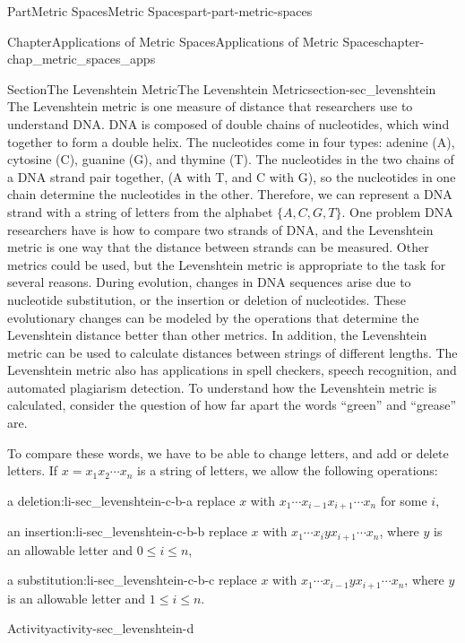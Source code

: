 \documentclass[oneside,10pt,]{book}
\numberwithin{equation}{chapter}
\begin{document}
\begin{partptx}{Part}{Metric Spaces}{}{Metric Spaces}{}{}{part-part-metric-spaces}
\begin{chapterptx}{Chapter}{Applications of Metric Spaces}{}{Applications of Metric Spaces}{}{}{chapter-chap_metric_spaces_apps}
\begin{sectionptx}{Section}{The Levenshtein Metric}{}{The Levenshtein Metric}{}{}{section-sec_levenshtein}
The Levenshtein metric is one measure of distance that researchers use to understand DNA. DNA is composed of double chains of nucleotides, which wind together to form a double helix. The nucleotides come in four types: adenine (A), cytosine (C), guanine (G), and thymine (T). The nucleotides in the two chains of a DNA strand pair together, (A with T, and C with G), so the nucleotides in one chain determine the nucleotides in the other. Therefore, we can represent a DNA strand with a string of letters from the alphabet \(\{A, C, G, T\}\). One problem DNA researchers have is how to compare two strands of DNA, and the Levenshtein metric is one way that the distance between strands can be measured. Other metrics could be used, but the Levenshtein metric is appropriate to the task for several reasons. During evolution, changes in DNA sequences arise due to nucleotide substitution, or the insertion or deletion of nucleotides. These evolutionary changes can be modeled by the operations that determine the Levenshtein distance better than other metrics. In addition, the Levenshtein metric can be used to calculate distances between strings of different lengths. The Levenshtein metric also has applications in spell checkers, speech recognition, and automated plagiarism detection. To understand how the Levenshtein metric is calculated, consider the question of how far apart the words ``green'' and ``grease'' are.%
\par
To compare these words, we have to be able to change letters, and add or delete letters. If \(x = x_1x_2 \cdots x_n\) is a string of letters, we allow the following operations:%
\begin{descriptionlist}
\begin{dlimedium}{a deletion:}{li-sec_levenshtein-c-b-a}%
replace \(x\) with \(x_1 \cdots x_{i-1}x_{i+1} \cdots x_n\) for some \(i\),%
\end{dlimedium}%
\begin{dlimedium}{an insertion:}{li-sec_levenshtein-c-b-b}%
replace \(x\) with \(x_1 \cdots x_{i}yx_{i+1} \cdots x_n\), where \(y\) is an allowable letter and \(0 \leq i \leq n\),%
\end{dlimedium}%
\begin{dlimedium}{a substitution:}{li-sec_levenshtein-c-b-c}%
replace \(x\) with \(x_1 \cdots x_{i-1}yx_{i+1} \cdots x_n\), where \(y\) is an allowable letter and \(1 \leq i \leq n\).%
\end{dlimedium}%
\end{descriptionlist}
%
\begin{activity}{Activity}{}{activity-sec_levenshtein-d}%

\end{activity}
\end{sectionptx}
\end{chapterptx}
\end{partptx}
\end{document}
